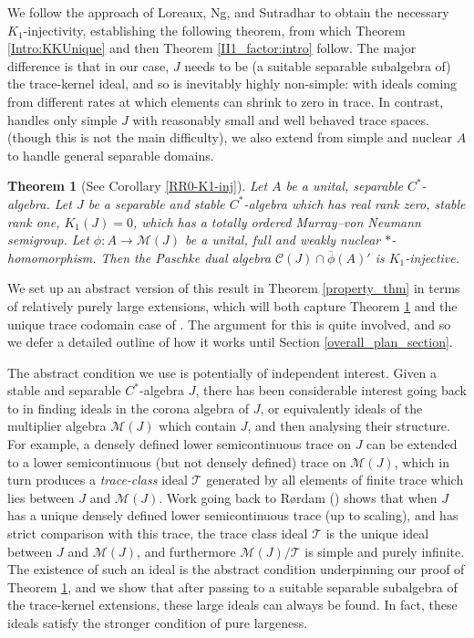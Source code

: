 \documentclass[reqno]{amsart}
\newtheorem{mainthm}{Theorem}
\theoremstyle{definition}
\theoremstyle{remark}
\numberwithin{equation}{section}
\theoremstyle{definition}
\newcommand{\calC}{\mathcal{C}}
\newcommand{\calM}{\mathcal{M}}
\begin{document}
We follow the approach of Loreaux, Ng, and Sutradhar to obtain the necessary $K_1$-injectivity, establishing the following  theorem, from which Theorem \ref{Intro:KKUnique} and then Theorem \ref{II1_factor:intro} follow. The major difference is that in our case, $J$ needs to be (a suitable separable subalgebra of) the trace-kernel ideal, and so is inevitably highly non-simple: with ideals coming from different rates at which elements can shrink to zero in trace. In contrast, \cite{K1-injective} handles only simple $J$ with reasonably small and well behaved trace spaces.  (though this is not the main difficulty), we also extend from simple and nuclear $A$ to handle general separable domains. 

\begin{mainthm}[See Corollary \ref{RR0-K1-inj}]  
\label{K1_inj_main_4.2_intro}  
    Let $A$ be a unital, separable $C^*$-algebra. Let $J$ be a separable and stable $C^*$-algebra which has real rank zero, stable rank one, $K_{1}(J) = 0$, which has a totally ordered Murray--von Neumann semigroup. Let ${\phi: A\rightarrow \calM(J)}$ be a unital, full and weakly nuclear $\ast$-homomorphism. Then the Paschke dual algebra $\calC(J)\cap \overline{\phi}(A)'$ is $K_{1}$-injective. 
\end{mainthm} 

We set up an abstract version of this result in Theorem \ref{property_thm} in terms of relatively purely large extensions, which will both capture Theorem \ref{K1_inj_main_4.2_intro} and the unique trace codomain case of \cite[Theorem 3.28]{K1-injective}.  The argument for this is quite involved, and so we defer a detailed outline of how it works until Section \ref{overall_plan_section}.

The abstract condition we use is potentially of independent interest. Given a stable and separable $C^*$-algebra $J$, there has been considerable interest going back to \cite{ideals_multiplier_finite} in finding ideals in the corona algebra of $J$, or equivalently ideals of the multiplier algebra $\calM(J)$ which contain $J$, and then analysing their structure. For example, a densely defined lower semicontinuous trace on $J$ can be extended to a lower semicontinuous (but not densely defined) trace on $\calM(J)$, which in turn produces a \emph{trace-class} ideal $\mathcal T$ generated by all elements of finite trace which lies between $J$ and $\calM(J)$. Work going back to R{\o}rdam (\cite{ideals_multiplier_finite}) shows that when $J$ has a unique densely defined lower semicontinuous trace (up to scaling), and has strict comparison with this trace, the trace class ideal $\mathcal T$ is the unique ideal between $J$ and $\calM(J)$, and furthermore $\calM(J)/\mathcal T$ is simple and purely infinite.  The existence of such an ideal is the abstract condition underpinning our proof of Theorem \ref{K1_inj_main_4.2_intro}, and we show that after passing to a suitable separable subalgebra of the trace-kernel extensions, these large ideals can always be found. In fact, these ideals satisfy the stronger condition of pure largeness. 
\end{document}
